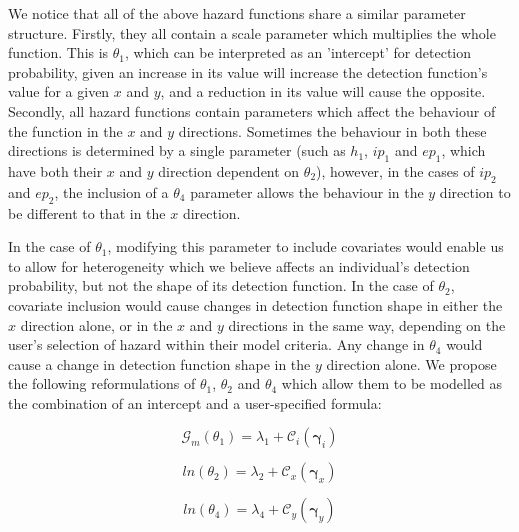 \documentclass[11pt]{article}
\begin{document}
\begin{multicols}{2}
We notice that all of the above hazard functions share a similar parameter structure. Firstly, they all contain a scale parameter which multiplies the whole function. This is $\theta_1$, which can be interpreted as an 'intercept' for detection probability, given an increase in its value will increase the detection function's value for a given $x$ and $y$, and a reduction in its value will cause the opposite. Secondly, all hazard functions contain parameters which affect the behaviour of the function in the $x$ and $y$ directions. Sometimes the behaviour in both these directions is determined by a single parameter (such as $h_1$, $ip_1$ and $ep_1$, which have both their $x$ and $y$ direction dependent on $\theta_2$), however, in the cases of $ip_2$ and $ep_2$, the inclusion of a $\theta_4$ parameter allows the behaviour in the $y$ direction to be different to that in the $x$ direction.

In the case of $\theta_1$, modifying this parameter to include covariates would enable us to allow for heterogeneity which we believe affects an individual's detection probability, but not the shape of its detection function. In the case of $\theta_2$, covariate inclusion would cause changes in detection function shape in either the $x$ direction alone, or in the $x$ and $y$ directions in the same way, depending on the user's selection of hazard within their model criteria. Any change in $\theta_4$ would cause a change in detection function shape in the $y$ direction alone. We propose the following reformulations of $\theta_1$, $\theta_2$ and $\theta_4$ which allow them to be modelled as the combination of an intercept and a user-specified formula:

\begingroup
\large
\begin{equation}
\mathcal{G}_m\left(\theta_1\right) = \lambda_1 + \mathcal{C}_i\left(\boldsymbol{\gamma}_i\right)
\end{equation}

\begin{equation}
ln\left(\theta_2\right) = \lambda_2 + \mathcal{C}_x\left(\boldsymbol{\gamma}_x\right)
\end{equation}

\begin{equation}
ln\left(\theta_4\right) = \lambda_4 + \mathcal{C}_y\left(\boldsymbol{\gamma}_y\right)
\end{equation}
\endgroup


\end{multicols}
\end{document}
